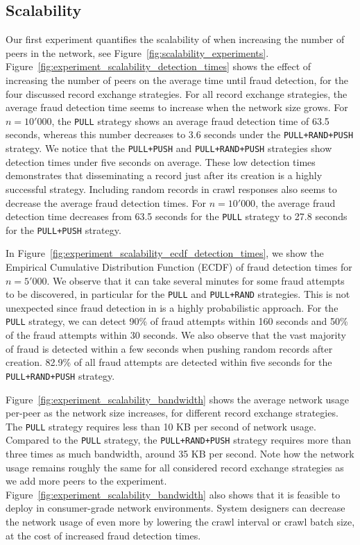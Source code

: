 \subsection{Scalability}
\label{sec:fraud_detection_experiment}
Our first experiment quantifies the scalability of \TrustChain{} when increasing the number of peers in the network, see Figure~\ref{fig:scalability_experiments}.
Figure~\ref{fig:experiment_scalability_detection_times} shows the effect of increasing the number of peers on the average time until fraud detection, for the four discussed record exchange strategies.
For all record exchange strategies, the average fraud detection time seems to increase when the network size grows.
For $ n = 10'000 $, the \texttt{PULL} strategy shows an average fraud detection time of 63.5 seconds, whereas this number decreases to 3.6 seconds under the \texttt{PULL+RAND+PUSH} strategy.
We notice that the \texttt{PULL+PUSH} and \texttt{PULL+RAND+PUSH} strategies show detection times under five seconds on average.
These low detection times demonstrates that disseminating a record just after its creation is a highly successful strategy.
Including random records in crawl responses also seems to decrease the average fraud detection times.
For $ n = 10'000 $, the average fraud detection time decreases from 63.5 seconds for the \texttt{PULL} strategy to 27.8 seconds for the \texttt{PULL+PUSH} strategy.

In Figure~\ref{fig:experiment_scalability_ecdf_detection_times}, we show the Empirical Cumulative Distribution Function (ECDF) of fraud detection times for $ n = 5'000 $.
We observe that it can take several minutes for some fraud attempts to be discovered, in particular for the \texttt{PULL} and \texttt{PULL+RAND} strategies.
This is not unexpected since fraud detection in \TrustChain{} is a highly probabilistic approach.
For the \texttt{PULL} strategy, we can detect 90\% of fraud attempts within 160 seconds and 50\% of the fraud attempts within 30 seconds.
We also observe that the vast majority of fraud is detected within a few seconds when pushing random records after creation.
82.9\% of all fraud attempts are detected within five seconds for the \texttt{PULL+RAND+PUSH} strategy.

Figure~\ref{fig:experiment_scalability_bandwidth} shows the average network usage per-peer as the network size increases, for different record exchange strategies.
The \texttt{PULL} strategy requires less than 10 KB per second of network usage.
Compared to the \texttt{PULL} strategy, the \texttt{PULL+RAND+PUSH} strategy requires more than three times as much bandwidth, around 35 KB per second.
Note how the network usage remains roughly the same for all considered record exchange strategies as we add more peers to the experiment.
Figure~\ref{fig:experiment_scalability_bandwidth} also shows that it is feasible to deploy \TrustChain{} in consumer-grade network environments.
System designers can decrease the network usage of \TrustChain{} even more by lowering the crawl interval or crawl batch size, at the cost of increased fraud detection times.


